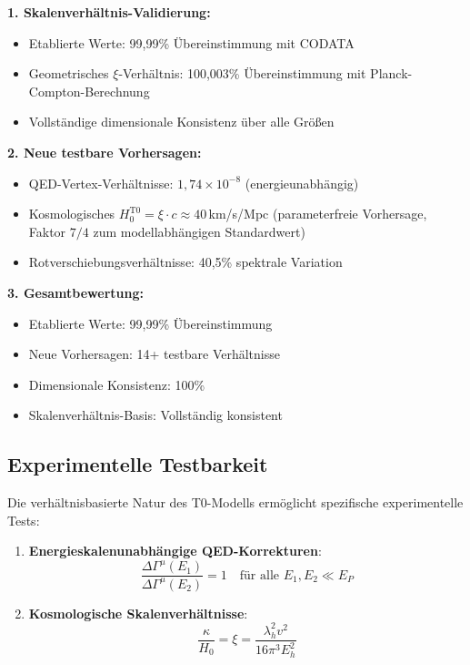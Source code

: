 	\begin{tcolorbox}[colback=green!5!white,colframe=green!75!black,title=Hauptergebnisse der T0-Verifikation]
		\textbf{1. Skalenverhältnis-Validierung:}
		\begin{itemize}
			\item Etablierte Werte: 99,99\% Übereinstimmung mit CODATA
			\item Geometrisches $\xi$-Verhältnis: 100,003\% Übereinstimmung mit Planck-Compton-Berechnung
			\item Vollständige dimensionale Konsistenz über alle Größen
		\end{itemize}
		
		\textbf{2. Neue testbare Vorhersagen:}
		\begin{itemize}
			\item QED-Vertex-Verhältnisse: $1,74 \times 10^{-8}$ (energieunabhängig)
			\item Kosmologisches $H_0^{\text{T0}} = \xi \cdot c \approx 40\,$km/s/Mpc (parameterfreie Vorhersage, Faktor $7/4$ zum modellabhängigen Standardwert)
			\item Rotverschiebungsverhältnisse: 40,5\% spektrale Variation
		\end{itemize}
		
		\textbf{3. Gesamtbewertung:}
		\begin{itemize}
			\item Etablierte Werte: 99,99\% Übereinstimmung
			\item Neue Vorhersagen: 14+ testbare Verhältnisse
			\item Dimensionale Konsistenz: 100\%
			\item Skalenverhältnis-Basis: Vollständig konsistent
		\end{itemize}
	\end{tcolorbox}
	
	\subsection{Experimentelle Testbarkeit}
	
	Die verhältnisbasierte Natur des T0-Modells ermöglicht spezifische experimentelle Tests:
	
	\begin{enumerate}
		\item \textbf{Energieskalenunabhängige QED-Korrekturen}:
		\begin{equation}
			\frac{\Delta\Gamma^{\mu}(E_1)}{\Delta\Gamma^{\mu}(E_2)} = 1 \quad \text{für alle } E_1, E_2 \ll E_P
		\end{equation}
		
		\item \textbf{Kosmologische Skalenverhältnisse}:
		\begin{equation}
			\frac{\kappa}{H_0} = \xi = \frac{\lambda_h^2 v^2}{16\pi^3 E_h^2}
		\end{equation}
	\end{enumerate}
	
